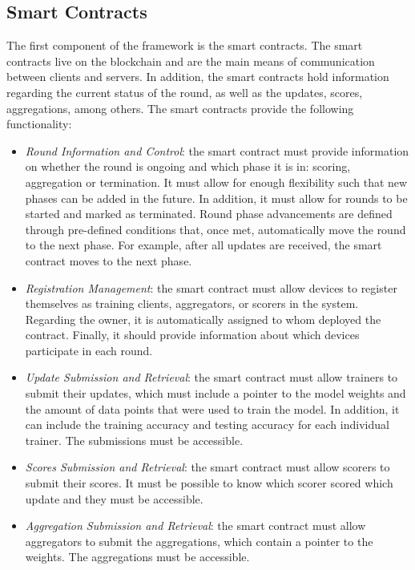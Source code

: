 \subsection{Smart Contracts}\label{meth:smart_contracts}

The first component of the framework is the smart contracts. The smart contracts live on the blockchain and are the main means of communication between clients and servers. In addition, the smart contracts hold information regarding the current status of the round, as well as the updates, scores, aggregations, among others. The smart contracts provide the following functionality:

\begin{itemize}
    \item \textit{Round Information and Control}: the smart contract must provide information on whether the round is ongoing and which phase it is in: scoring, aggregation or termination. It must allow for enough flexibility such that new phases can be added in the future. In addition, it must allow for rounds to be started and marked as terminated. Round phase advancements are defined through pre-defined conditions that, once met, automatically move the round to the next phase. For example, after all updates are received, the smart contract moves to the next phase.
    
    \item \textit{Registration Management}: the smart contract must allow devices to register themselves as training clients, aggregators, or scorers in the system. Regarding the owner, it is automatically assigned to whom deployed the contract. Finally, it should provide information about which devices participate in each round.
    
    \item \textit{Update Submission and Retrieval}: the smart contract must allow trainers to submit their updates, which must include a pointer to the model weights and the amount of data points that were used to train the model. In addition, it can include the training accuracy and testing accuracy for each individual trainer. The submissions must be accessible.
    
    \item \textit{Scores Submission and Retrieval}: the smart contract must allow scorers to submit their scores. It must be possible to know which scorer scored which update and they must be accessible.
    
    \item \textit{Aggregation Submission and Retrieval}: the smart contract must allow aggregators to submit the aggregations, which contain a pointer to the weights. The aggregations must be accessible.
\end{itemize}

